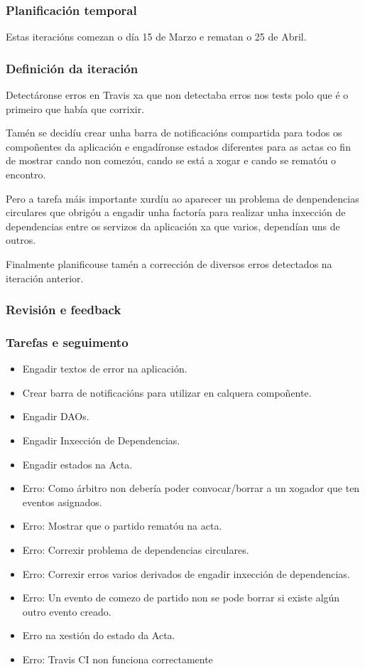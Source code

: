       \subsubsection{Planificación temporal}
      Estas iteracións comezan o día 15 de Marzo e rematan o 25 de Abril.

      \subsubsection{Definición da iteración}
      Detectáronse erros en Travis xa que non detectaba erros nos tests polo 
que é o primeiro que había que corrixir.

      Tamén se decidíu crear unha barra de notificacións compartida para todos 
os compoñentes da aplicación e engadíronse estados diferentes para as actas co 
fin de mostrar cando non comezóu, cando se está a xogar e cando se rematóu o 
encontro.

      Pero a tarefa máis importante xurdíu ao aparecer un problema de 
denpendencias circulares que obrigóu a engadir unha factoría para realizar unha 
inxección de dependencias entre os servizos da aplicación xa que varios, 
dependían uns de outros.

      Finalmente planificouse tamén a corrección de diversos erros detectados 
na iteración anterior.

      \subsubsection{Revisión e feedback}

      \subsubsection{Tarefas e seguimento}

      \begin{itemize}
       \item Engadir textos de error na aplicación.
       \item Crear barra de notificacións para utilizar en calquera compoñente.
       \item Engadir DAOs.
       \item Engadir Inxección de Dependencias.
       \item Engadir estados na Acta.
       \item Erro: Como árbitro non debería poder convocar/borrar a un xogador 
que ten eventos asignados.
       \item Erro: Mostrar que o partido rematóu na acta.
       \item Erro: Correxir problema de dependencias circulares.
       \item Erro: Correxir erros varios derivados de engadir inxección de 
dependencias.
       \item Erro: Un evento de comezo de partido non se pode borrar si existe 
algún outro evento creado.
       \item Erro na xestión do estado da Acta.
       \item Erro: Travis CI non funciona correctamente
      \end{itemize}

